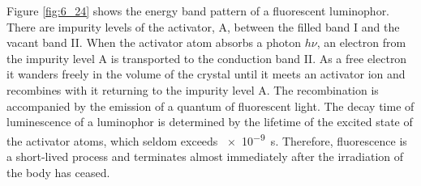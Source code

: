Figure \ref{fig:6_24} shows the energy band pattern of a fluorescent luminophor. There are impurity levels of the activator, A, between the filled band I and the vacant band II. When the activator atom absorbs a photon $h\nu$, an electron from the impurity level A is transported to the conduction band II. As a free electron it wanders freely in the
volume of the crystal until it meets an activator ion and recombines with it returning to the impurity level A. The recombination is accompanied by the emission of a quantum of fluorescent light. The decay time of luminescence of a luminophor is determined by the lifetime of the excited state of the activator atoms, which seldom exceeds \SI{e-9}{\second}. Therefore, fluorescence is a short-lived process and terminates almost immediately after the irradiation of the body has ceased.

